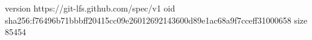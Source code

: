version https://git-lfs.github.com/spec/v1
oid sha256:f76496b71bbbff20415cc09e26012692143600d89e1ac68a9f7cceff31000658
size 85454
